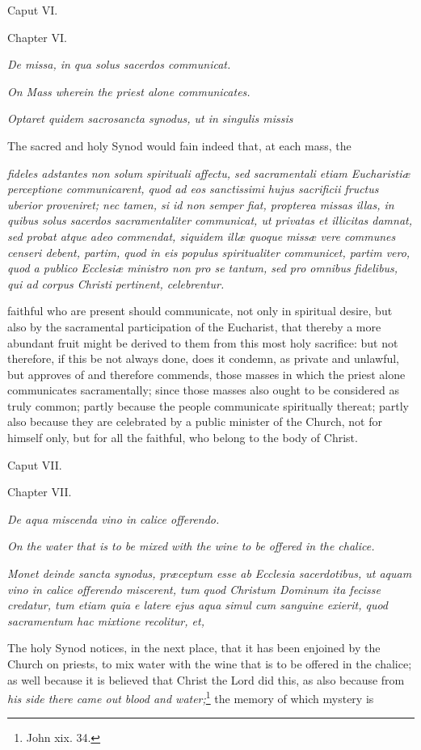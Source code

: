 Caput VI.

Chapter VI.

\emph{De missa, in qua solus sacerdos communicat.}

\emph{On Mass wherein the priest alone communicates.}

\emph{Optaret quidem sacrosancta synodus, ut in singulis missis }

The sacred and holy Synod would fain indeed that, at each mass, the

\emph{fideles adstantes non solum spirituali affectu, sed sacramentali etiam Eucharistiæ perceptione communicarent, quod ad eos sanctissimi hujus sacrificii fructus uberior proveniret; nec tamen, si id non semper fiat, propterea missas illas, in quibus solus sacerdos sacramentaliter communicat, ut privatas et illicitas damnat, sed probat atque adeo commendat, siquidem illæ quoque missæ vere communes censeri debent, partim, quod in eis populus spiritualiter communicet, partim vero, quod a publico Ecclesiæ ministro non pro se tantum, sed pro omnibus fidelibus, qui ad corpus Christi pertinent, celebrentur.}

faithful who are present should communicate, not only in spiritual desire, but also by the sacramental participation of the Eucharist, that thereby a more abundant fruit might be derived to them from this most holy sacrifice: but not therefore, if this be not always done, does it condemn, as private and unlawful, but approves of and therefore commends, those masses in which the priest alone communicates sacramentally; since those masses also ought to be considered as truly common; partly because the people communicate spiritually thereat; partly also because they are celebrated by a public minister of the Church, not for himself only, but for all the faithful, who belong to the body of Christ.

Caput VII.

Chapter VII.

\emph{De aqua miscenda vino in calice offerendo.}

\emph{On the water that is to be mixed with the wine to be offered in the chalice.}

\emph{Monet deinde sancta synodus, præceptum esse ab Ecclesia sacerdotibus, ut aquam vino in calice offerendo miscerent, tum quod Christum Dominum ita fecisse credatur, tum etiam quia e latere ejus aqua simul cum sanguine exierit, quod sacramentum hac mixtione recolitur, et, }

The holy Synod notices, in the next place, that it has been enjoined by the Church on priests, to mix water with the wine that is to be offered in the chalice; as well because it is believed that Christ the Lord did this, as also because from \emph{his side there came out blood and water;}\footnote{\par   John xix. 34.} the memory of which mystery is

